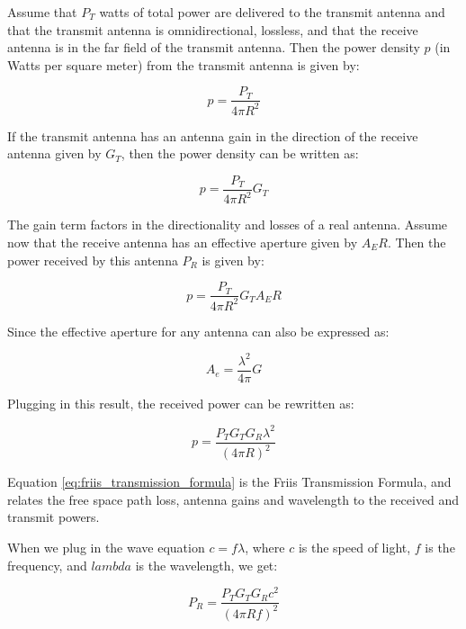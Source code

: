 \documentclass[a4paper,12pt]{report}
\begin{document}
Assume that $P_T$ watts of total power are delivered
to the transmit antenna and that the transmit antenna is omnidirectional, lossless,
and that the receive antenna is in the far field of the transmit antenna.
Then the power density $p$ (in Watts per square meter)
from the transmit antenna is given by:

\begin{equation}
  p = \frac{P_T}{4\pi R^2}
\end{equation}

If the transmit antenna has an antenna gain
in the direction of the receive antenna given by $G_T$,
then the power density can be written as:

\begin{equation}
  p = \frac{P_T}{4\pi R^2} G_T
\end{equation}

The gain term factors in the directionality and losses of a real antenna.
Assume now that the receive antenna has an effective aperture given by $A_ER$.
Then the power received by this antenna $P_R$ is given by:

\begin{equation}
  p = \frac{P_T}{4\pi R^2} G_T A_ER
\end{equation}

Since the effective aperture for any antenna can also be expressed as:

\begin{equation}
  A_e = \frac{\lambda ^ 2}{4 \pi} G
\end{equation}

Plugging in this result, the received power can be rewritten as:

\begin{equation} \label{eq:friis_transmission_formula}
  p = \frac{P_T G_T G_R \lambda^2}{(4\pi R)^2}
\end{equation}

Equation \ref{eq:friis_transmission_formula} is the
Friis Transmission Formula, and relates the free space path loss,
antenna gains and wavelength to the received and transmit powers.

When we plug in the wave equation $c = f\lambda$,
where $c$ is the speed of light, $f$ is the frequency,
and $lambda$ is the wavelength, we get:

\begin{equation} \label{eq:friis_transmission_formula_ver2}
  P_R = \frac{P_T G_T G_R c^2}{(4\pi R f)^2}
\end{equation}
\end{document}
